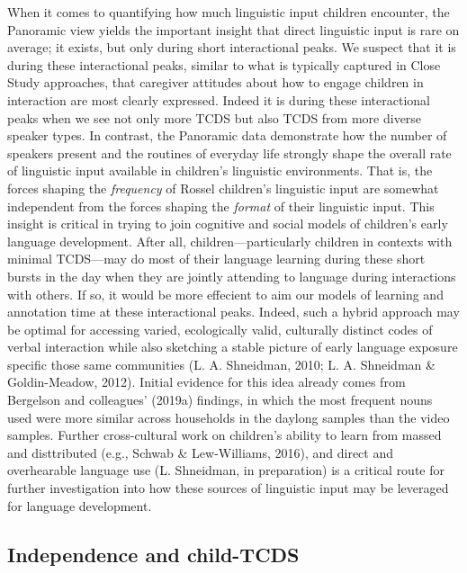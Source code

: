 \documentclass[,man,floatsintext]{apa6}
\begin{document}
When it comes to quantifying how much linguistic input children
encounter, the Panoramic view yields the important insight that direct
linguistic input is rare on average; it exists, but only during short
interactional peaks. We suspect that it is during these interactional
peaks, similar to what is typically captured in Close Study approaches,
that caregiver attitudes about how to engage children in interaction are
most clearly expressed. Indeed it is during these interactional peaks
when we see not only more TCDS but also TCDS from more diverse speaker
types. In contrast, the Panoramic data demonstrate how the number of
speakers present and the routines of everyday life strongly shape the
overall rate of linguistic input available in children's linguistic
environments. That is, the forces shaping the \emph{frequency} of Rossel
children's linguistic input are somewhat independent from the forces
shaping the \emph{format} of their linguistic input. This insight is
critical in trying to join cognitive and social models of children's
early language development. After all, children---particularly children
in contexts with minimal TCDS---may do most of their language learning
during these short bursts in the day when they are jointly attending to
language during interactions with others. If so, it would be more
effecient to aim our models of learning and annotation time at these
interactional peaks. Indeed, such a hybrid approach may be optimal for
accessing varied, ecologically valid, culturally distinct codes of
verbal interaction while also sketching a stable picture of early
language exposure specific those same communities (L. A. Shneidman,
2010; L. A. Shneidman \& Goldin-Meadow, 2012). Initial evidence for this
idea already comes from Bergelson and colleagues' (2019a) findings, in
which the most frequent nouns used were more similar across households
in the daylong samples than the video samples. Further cross-cultural
work on children's ability to learn from massed and disttributed (e.g.,
Schwab \& Lew-Williams, 2016), and direct and overhearable language use
(L. Shneidman, in preparation) is a critical route for further
investigation into how these sources of linguistic input may be
leveraged for language development.

\subsection{Independence and
child-TCDS}\label{independence-and-child-tcds}
\end{document}
